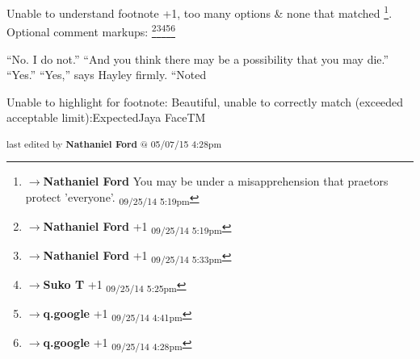 	Unable to understand footnote +1, too many options & none that matched \footnote{$\rightarrow$\textbf{Nathaniel Ford }You may be under a misapprehension that praetors protect 'everyone'. \textsubscript{09/25/14 5:19pm}}. Optional comment markups: \footnote{$\rightarrow$\textbf{Nathaniel Ford }+1 \textsubscript{09/25/14 5:19pm}}\footnote{$\rightarrow$\textbf{Nathaniel Ford }+1 \textsubscript{09/25/14 5:33pm}}\footnote{$\rightarrow$\textbf{Suko T }+1 \textsubscript{09/25/14 5:25pm}}\footnote{$\rightarrow$\textbf{q.google }+1 \textsubscript{09/25/14 4:41pm}}\footnote{$\rightarrow$\textbf{q.google }+1 \textsubscript{09/25/14 4:28pm}} 

“No. I do not.”
“And you think there may be a possibility that you may die.”
“Yes.”
“Yes,” says Hayley firmly.
“Noted

	Unable to highlight for footnote: Beautiful, unable to correctly match (exceeded acceptable limit):ExpectedJaya FaceTM


\fi

\vspace{\fill}

\begin{flushright}
\textsubscript{last edited by \textbf{Nathaniel Ford} @ 05/07/15 4:28pm}
\end{flushright}

